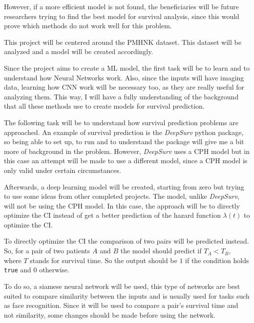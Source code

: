 However, if a more efficient model is not found, the beneficiaries will be future researchers
trying to find the best model for survival analysis, since this would prove which 
methods do not work well for this problem.


This project will be centered around the \gls{PMHNK} dataset. This dataset will be analyzed
and a model will be created accordingly.

Since the project aims to create a \gls{ML} model, the first task will be to learn and 
to understand how Neural Networks work. Also, since the inputs will have imaging data, learning
how \gls{CNN} work will be necessary too, as they are really useful for analyzing them. 
This way, I will have a fully understanding of the 
background that all these methods use to create models for survival prediction.

The following task will be to understand how survival prediction problems are approached. An
example of survival prediction is the \emph{DeepSurv} python package, so being able to set 
up, to run and to understand the package will give me a bit more of background in the problem.
However, \emph{DeepSurv} uses a \gls{CPH} model but in this case an attempt will be made to use
a different model, since a \gls{CPH} model is only valid under certain circumstances.
~\cites{medical:deep-surv-github}{medical:cox}

Afterwards, a deep learning model will be created, starting from zero but trying to use some
ideas from other completed projects. The model, unlike \emph{DeepSurv}, will not be using
the \gls{CPH} model. In this case, the approach will be to directly optimize the \gls{CI}
instead of get a better prediction of the hazard function \( \lambda(t) \) to optimize 
the \gls{CI}.

To directly optimize the \gls{CI} the comparison of two pairs will be predicted instead. So,
for a pair of two patients \( A \) and \( B \) the model should predict if \( T_A < T_B \),
where \( T \) stands for survival time. So the output should be \( 1 \) if the condition holds
\texttt{true} and \( 0 \) otherwise.

To do so, a siamese neural network will be used,
this type of networks are best suited to compare similarity between the inputs and is usually
used for tasks such as face recognition. Since it will be used to compare a pair's survival
time and not similarity, some changes should be made before using the network.

